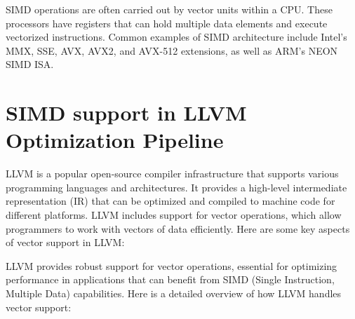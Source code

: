 SIMD operations are often carried out by vector units within a CPU.
These processors have registers that can hold multiple data elements
and execute vectorized instructions.
%
Common examples of SIMD
architecture include Intel’s MMX, SSE, AVX, AVX2, and AVX-512
extensions, as well as ARM’s NEON SIMD ISA.


\section{SIMD support in LLVM Optimization Pipeline}
\label{sec:llvm-vectors}

LLVM is a popular open-source compiler infrastructure that supports
various programming languages and architectures. It provides a
high-level intermediate representation (IR) that can be optimized and
compiled to machine code for different platforms. LLVM includes
support for vector operations, which allow programmers to work with
vectors of data efficiently. Here are some key aspects of vector
support in LLVM:

LLVM provides robust support for vector operations, essential for
optimizing performance in applications that can benefit from SIMD
(Single Instruction, Multiple Data) capabilities. Here is a detailed
overview of how LLVM handles vector support:

